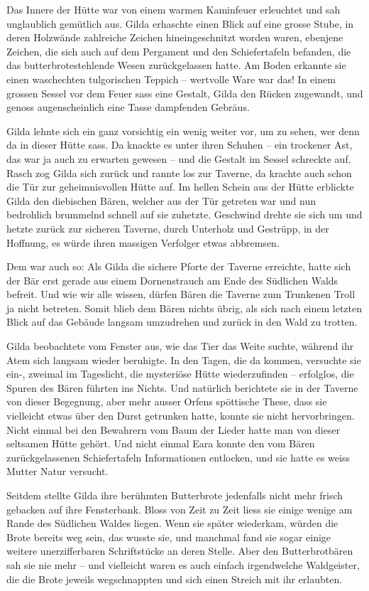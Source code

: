 \documentclass[10pt, a4paper, oneside]{book}
\begin{document}
Das Innere der Hütte war von einem warmen Kaminfeuer erleuchtet und sah unglaublich gemütlich aus. Gilda erhaschte einen Blick auf eine grosse Stube, in deren Holzwände zahlreiche Zeichen hineingeschnitzt worden waren, ebenjene Zeichen, die sich auch auf dem Pergament und den Schiefertafeln befanden, die das butterbrotestehlende Wesen zurückgelassen hatte. Am Boden erkannte sie einen waschechten tulgorischen Teppich – wertvolle Ware war das! In einem grossen Sessel vor dem Feuer sass eine Gestalt, Gilda den Rücken zugewandt, und genoss augenscheinlich eine Tasse dampfenden Gebräus.

Gilda lehnte sich ein ganz vorsichtig ein wenig weiter vor, um zu sehen, wer denn da in dieser Hütte sass. Da knackte es unter ihren Schuhen – ein trockener Ast, das war ja auch zu erwarten gewesen – und die Gestalt im Sessel schreckte auf. Rasch zog Gilda sich zurück und rannte los zur Taverne, da krachte auch schon die Tür zur geheimnisvollen Hütte auf. Im hellen Schein aus der Hütte erblickte Gilda den diebischen Bären, welcher aus der Tür getreten war und nun bedrohlich brummelnd schnell auf sie zuhetzte. Geschwind drehte sie sich um und hetzte zurück zur sicheren Taverne, durch Unterholz und Gestrüpp, in der Hoffnung, es würde ihren massigen Verfolger etwas abbremsen.

Dem war auch so: Als Gilda die sichere Pforte der Taverne erreichte, hatte sich der Bär erst gerade aus einem Dornenstrauch am Ende des Südlichen Walds befreit. Und wie wir alle wissen, dürfen Bären die Taverne zum Trunkenen Troll ja nicht betreten. Somit blieb dem Bären nichts übrig, als sich nach einem letzten Blick auf das Gebäude langsam umzudrehen und zurück in den Wald zu trotten.

Gilda beobachtete vom Fenster aus, wie das Tier das Weite suchte, während ihr Atem sich langsam wieder beruhigte. In den Tagen, die da kommen, versuchte sie ein-, zweimal im Tageslicht, die mysteriöse Hütte wiederzufinden – erfolglos, die Spuren des Bären führten ins Nichts. Und natürlich berichtete sie in der Taverne von dieser Begegnung, aber mehr ausser Orfens spöttische These, dass sie vielleicht etwas über den Durst getrunken hatte, konnte sie nicht hervorbringen. Nicht einmal bei den Bewahrern vom Baum der Lieder hatte man von dieser seltsamen Hütte gehört. Und nicht einmal Eara konnte den vom Bären zurückgelassenen Schiefertafeln Informationen entlocken, und sie hatte es weiss Mutter Natur versucht.

Seitdem stellte Gilda ihre berühmten Butterbrote jedenfalls nicht mehr frisch gebacken auf ihre Fensterbank. Bloss von Zeit zu Zeit liess sie einige wenige am Rande des Südlichen Waldes liegen. Wenn sie später wiederkam, würden die Brote bereits weg sein, das wusste sie, und manchmal fand sie sogar einige weitere unerzifferbaren Schriftstücke an deren Stelle. Aber den Butterbrotbären sah sie nie mehr – und vielleicht waren es auch einfach irgendwelche Waldgeister, die die Brote jeweils wegschnappten und sich einen Streich mit ihr erlaubten.
\end{document}
